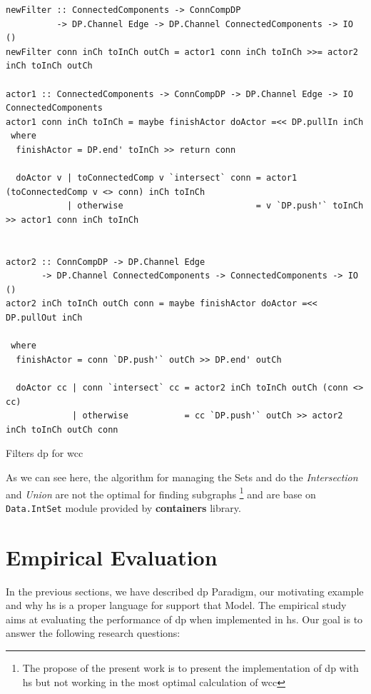 \documentclass[preprint]{elsarticle}
\begin{document}
\begin{listing}[H]
\begin{verbatim}
newFilter :: ConnectedComponents -> ConnCompDP 
          -> DP.Channel Edge -> DP.Channel ConnectedComponents -> IO ()
newFilter conn inCh toInCh outCh = actor1 conn inCh toInCh >>= actor2 inCh toInCh outCh

actor1 :: ConnectedComponents -> ConnCompDP -> DP.Channel Edge -> IO ConnectedComponents
actor1 conn inCh toInCh = maybe finishActor doActor =<< DP.pullIn inCh
 where
  finishActor = DP.end' toInCh >> return conn

  doActor v | toConnectedComp v `intersect` conn = actor1 (toConnectedComp v <> conn) inCh toInCh
            | otherwise                          = v `DP.push'` toInCh >> actor1 conn inCh toInCh


actor2 :: ConnCompDP -> DP.Channel Edge 
       -> DP.Channel ConnectedComponents -> ConnectedComponents -> IO ()
actor2 inCh toInCh outCh conn = maybe finishActor doActor =<< DP.pullOut inCh

 where
  finishActor = conn `DP.push'` outCh >> DP.end' outCh

  doActor cc | conn `intersect` cc = actor2 inCh toInCh outCh (conn <> cc)
             | otherwise           = cc `DP.push'` outCh >> actor2 inCh toInCh outCh conn
\end{verbatim}
\caption{Filters \acrshort{dp} for \acrshort{wcc}}
\label{src:haskell:3}
\end{listing}

As we can see here, the algorithm for managing the Sets and do the \textit{Intersection} and \textit{Union} are not the  optimal for finding subgraphs\label{not:optimal}
\footnote{The propose of the present work is to present the implementation of \acrshort{dp} with \acrshort{hs} but not working in the most optimal calculation of \acrshort{wcc}} and are base
on \texttt{Data.IntSet} module provided by \textbf{containers} \cite{containers} library.

\section{Empirical Evaluation}
In the previous sections, we have described \acrshort{dp} Paradigm, our motivating example and why \acrshort{hs} is a proper language for support that Model.
The empirical study aims at evaluating the performance of \acrshort{dp} when implemented in \acrshort{hs}. 
Our goal is to answer the following research questions: 
\end{document}
